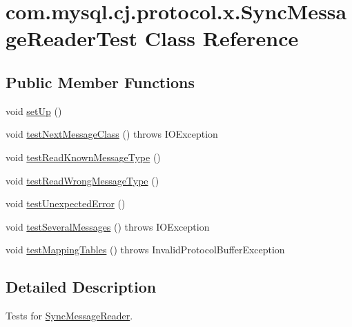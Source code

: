\hypertarget{classcom_1_1mysql_1_1cj_1_1protocol_1_1x_1_1_sync_message_reader_test}{}\section{com.\+mysql.\+cj.\+protocol.\+x.\+Sync\+Message\+Reader\+Test Class Reference}
\label{classcom_1_1mysql_1_1cj_1_1protocol_1_1x_1_1_sync_message_reader_test}
\subsection*{Public Member Functions}
\begin{DoxyCompactItemize}
\item 
void \mbox{\hyperlink{classcom_1_1mysql_1_1cj_1_1protocol_1_1x_1_1_sync_message_reader_test_a38e29c46cf4e2d1df8a67c6b7a650eca}{set\+Up}} ()
\item 
void \mbox{\hyperlink{classcom_1_1mysql_1_1cj_1_1protocol_1_1x_1_1_sync_message_reader_test_a1570bd2084f53957a4e5d307943fc7c9}{test\+Next\+Message\+Class}} ()  throws I\+O\+Exception 
\item 
void \mbox{\hyperlink{classcom_1_1mysql_1_1cj_1_1protocol_1_1x_1_1_sync_message_reader_test_ae6eea19c7e4e2ae5fc1af86f0843012e}{test\+Read\+Known\+Message\+Type}} ()
\item 
void \mbox{\hyperlink{classcom_1_1mysql_1_1cj_1_1protocol_1_1x_1_1_sync_message_reader_test_ac7f1d29ed603082d8d5ae1e1d6452b29}{test\+Read\+Wrong\+Message\+Type}} ()
\item 
void \mbox{\hyperlink{classcom_1_1mysql_1_1cj_1_1protocol_1_1x_1_1_sync_message_reader_test_a17dbdcaef334349d660ff880c2de6daa}{test\+Unexpected\+Error}} ()
\item 
void \mbox{\hyperlink{classcom_1_1mysql_1_1cj_1_1protocol_1_1x_1_1_sync_message_reader_test_a22b8b0451c4dc79d8613938c60802da9}{test\+Several\+Messages}} ()  throws I\+O\+Exception 
\item 
void \mbox{\hyperlink{classcom_1_1mysql_1_1cj_1_1protocol_1_1x_1_1_sync_message_reader_test_ab063fb28df87040e23afe85d95d26971}{test\+Mapping\+Tables}} ()  throws Invalid\+Protocol\+Buffer\+Exception 
\end{DoxyCompactItemize}


\subsection{Detailed Description}
Tests for \mbox{\hyperlink{classcom_1_1mysql_1_1cj_1_1protocol_1_1x_1_1_sync_message_reader}{Sync\+Message\+Reader}}. 

